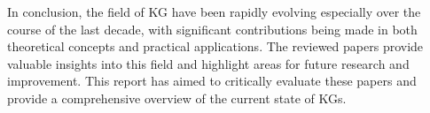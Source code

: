 \documentclass[11pt]{article} %
\begin{document}
In conclusion, the field of KG have been rapidly evolving especially over the course of the last decade, with significant contributions being made in both theoretical concepts and practical applications. The reviewed papers provide valuable insights into this field and highlight areas for future research and improvement. This report has aimed to critically evaluate these papers and provide a comprehensive overview of the current state of KGs.




\newpage
\printglossary[type=\acronymtype]

\printglossary

\newpage
\printbibliography[
    heading=bibintoc,
    category=cited,
    title={References}
]

\printbibliography[
    notcategory=cited,
    heading=bibintoc,
    title={Additional bibliography},
]


\restoregeometry
\end{document}

